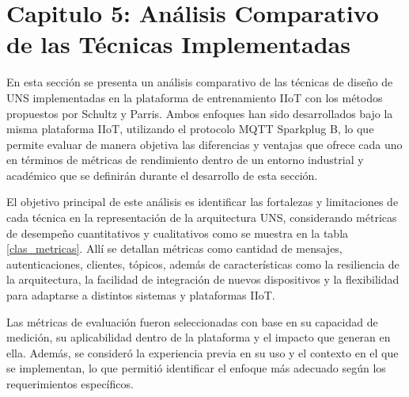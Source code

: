 \section{Capitulo 5: Análisis Comparativo de las Técnicas Implementadas}


En esta sección se presenta un análisis comparativo de las técnicas de diseño de UNS implementadas en la plataforma de entrenamiento IIoT con los métodos propuestos por Schultz y Parris. Ambos enfoques han sido desarrollados bajo la misma plataforma IIoT, utilizando el protocolo MQTT Sparkplug B, lo que permite evaluar de manera objetiva las diferencias y ventajas que ofrece cada uno en términos de métricas de rendimiento dentro de un entorno industrial y académico que se definirán durante el desarrollo de esta sección. 

El objetivo principal de este análisis es identificar las fortalezas y limitaciones de cada técnica en la representación de la arquitectura UNS, considerando métricas de desempeño cuantitativos y cualitativos como se muestra en la tabla \ref{clas_metricas}. Allí se detallan métricas como cantidad de mensajes, autenticaciones, clientes, tópicos, además de características como la resiliencia de la arquitectura, la facilidad de integración de nuevos dispositivos y la flexibilidad para adaptarse a distintos sistemas y plataformas IIoT.



Las métricas de evaluación fueron seleccionadas con base en su capacidad de medición, su aplicabilidad dentro de la plataforma y el impacto que generan en ella. Además, se consideró la experiencia previa en su uso y el contexto en el que se implementan, lo que permitió identificar el enfoque más adecuado según los requerimientos específicos.



